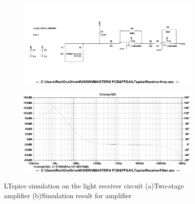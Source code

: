\begin{figure}
\centering
\begin{subfigure}{1\textwidth}
  \centering
  \includegraphics[width=1\linewidth]{4-ANC_Sys/LTspiceAmpSch.pdf}
  \caption{}
  \label{fig_LTspiceAmpSch}
\end{subfigure}
\begin{subfigure}{1\textwidth}
  \centering
  \includegraphics[width=1\linewidth]{4-ANC_Sys/LTspiceAmp.pdf}
  \caption{}
  \label{fig_LTspiceAmp}
\end{subfigure}
\caption{LTspice simulation on the light receiver circuit (a)Two-stage amplifier (b)Simulation result for amplifier}
\label{fig_LTspiceSim1}
\end{figure}


